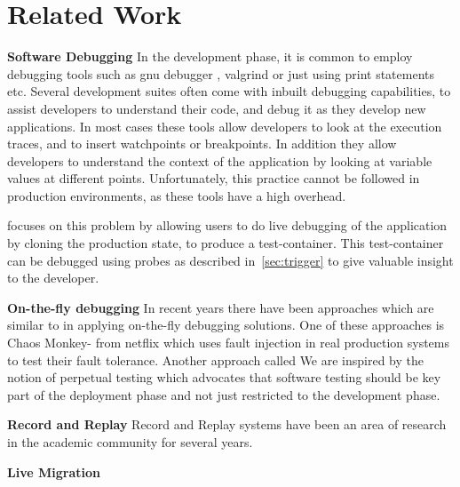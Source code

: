 \section{Related Work}
\label{sec:related}


  
\textbf{Software Debugging}  
  In the development phase, it is common to employ debugging tools such as gnu debugger \cite{gdb}, valgrind \cite{valgrind} or just using print statements etc.
  Several development suites\cite{eclipse, visual_studio, intel_suite} often come with inbuilt debugging capabilities, to assist developers to understand their code, and debug it as they develop new applications.
  In most cases these tools allow developers to look at the execution traces, and to insert watchpoints or breakpoints.
  In addition they allow developers to understand the context of the application by looking at variable values at different points.
  Unfortunately, this practice cannot be followed in production environments, as these tools have a high overhead.
  
  \parikshan focuses on this problem by allowing users to do live debugging of the application by cloning the production state, to produce a test-container.
  This test-container can be debugged using probes as described in~\ref{sec:trigger} to give valuable insight to the developer.
  
    
\textbf{On-the-fly debugging}
In recent years there have been approaches which are similar to \parikshan in applying on-the-fly debugging solutions.
One of these approaches is Chaos Monkey-\cite{chaosmonkey} from netflix which uses fault injection in real production systems to test their fault tolerance.
Another approach called 
We are inspired by the notion of perpetual testing\cite{perpetual} which advocates that software testing should be key part of the deployment phase and not just restricted to the development phase.
  
\textbf{Record and Replay}  
  Record and Replay systems have been an area of research in the academic community for several years.
  
  \cite{altekar2009odr,dunlap2002revirt,guo2008r2, geels2007friday, laadan2010transparent}

\textbf{Live Migration}

  
  

